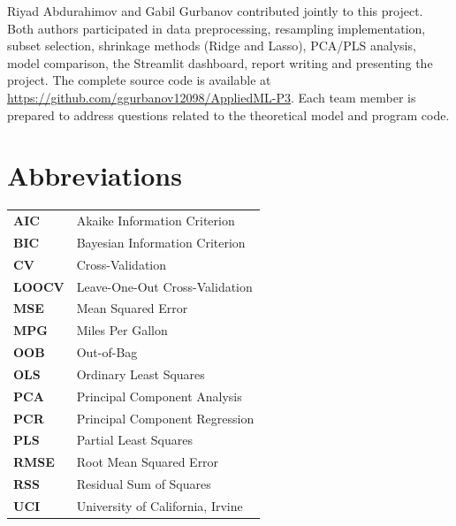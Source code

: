 \documentclass[conference]{IEEEtran}
\begin{document}
Riyad Abdurahimov and Gabil Gurbanov contributed jointly to this project. Both authors participated in data preprocessing, resampling implementation, subset selection, shrinkage methods (Ridge and Lasso), PCA/PLS analysis, model comparison, the Streamlit dashboard, report writing and presenting the project. The complete source code is available at \url{https://github.com/ggurbanov12098/AppliedML-P3}. Each team member is prepared to address questions related to the theoretical model and program code.

\section*{Abbreviations}
\label{sec:abbrev}

\vspace{0.5em}
\noindent
\small
\begin{tabular}{ll}
\textbf{AIC} & Akaike Information Criterion \\
\textbf{BIC} & Bayesian Information Criterion \\
\textbf{CV} & Cross-Validation \\
\textbf{LOOCV} & Leave-One-Out Cross-Validation \\
\textbf{MSE} & Mean Squared Error \\
\textbf{MPG} & Miles Per Gallon \\
\textbf{OOB} & Out-of-Bag \\
\textbf{OLS} & Ordinary Least Squares \\
\textbf{PCA} & Principal Component Analysis \\
\textbf{PCR} & Principal Component Regression \\
\textbf{PLS} & Partial Least Squares \\
\textbf{RMSE} & Root Mean Squared Error \\
\textbf{RSS} & Residual Sum of Squares \\
\textbf{UCI} & University of California, Irvine \\
\end{tabular}
\normalsize

\end{document}

